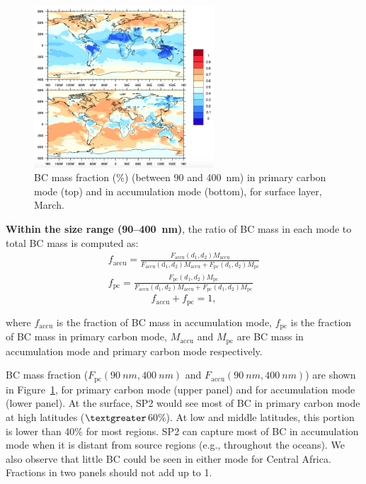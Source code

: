 \documentclass[11pt]{article}
\begin{document}
\begin{figure}[!h] 
	\begin{center}
		\includegraphics[width = 0.6\textwidth]{Rplot02}
		\caption[]{\label{fig_P2} BC mass fraction ($\%$) (between 90 and 400~nm) in primary carbon mode (top) and in accumulation mode (bottom), for surface layer, March.}
	\end{center}
\end{figure}


\noindent \textbf{Within the size range (90--400~nm)}, the ratio of BC mass in each mode to total BC mass is computed as:
\begin{align*}
f_{\text{accu}} = \frac{F_{\text{accu}}(d_{1}, d_{2})M_{\text{accu}}}{F_{\text{accu}}(\text{d}_{1}, d_{2})M_{\text{accu}}+F_{\text{pc}}(d_{1}, d_{2})M_{\text{pc}}}\\
f_{\text{pc}} = \frac{F_{\text{pc}}(d_{1}, d_{2})M_{\text{pc}}}{F_{\text{accu}}(d_{1}, d_{2})M_{\text{accu}}+F_{\text{pc}}(d_{1}, d_{2})M_{\text{pc}}}
\end{align*}
\[f_{\text{accu}} + f_{\text{pc}} = 1,\]

\noindent where $f_{\text{accu}}$ is the fraction of BC mass in accumulation mode, $f_{\text{pc}}$ is the fraction of BC mass in primary carbon mode, $M_{\text{accu}}$ and $M_{\text{pc}}$ are BC mass in accumulation mode and primary carbon mode respectively.

\noindent BC mass fraction ($F_{\text{pc}}(90~nm, 400~nm)$ and $F_{\text{accu}}(90~nm, 400~nm)$) are shown in Figure~\ref{fig_P2}, for primary carbon mode (upper panel) and for accumulation mode (lower panel). At the surface, SP2 would see most of BC in primary carbon mode at high latitudes ($\textgreater$60$\%$). At low and middle latitudes, this portion is lower than 40$\%$ for most regions. SP2 can capture most of BC in accumulation mode when it is distant from source regions (e.g., throughout the oceans). We also observe that little BC could be seen in either mode for Central Africa. Fractions in two panels should not add up to 1.
\end{document}
